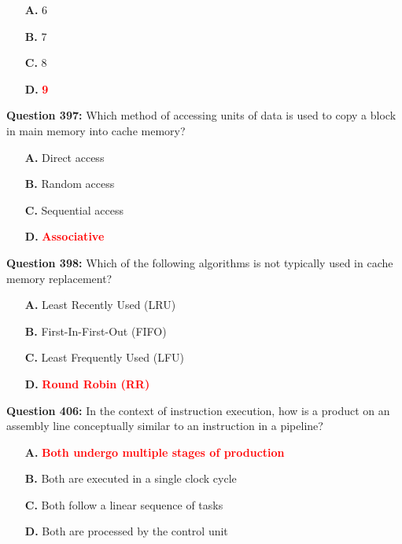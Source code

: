 \documentclass[12pt,a4paper]{article}
\begin{document}
\begin{itemize}
    \item[\textbf{A.}] 6
    \item[\textbf{B.}] 7
    \item[\textbf{C.}] 8
    \item[\textbf{D.}] \textcolor{red}{\textbf{9}}
\end{itemize}

\vspace{0.5cm}

\textbf{Question 397:} Which method of accessing units of data is used to copy a block in main memory into cache memory?

\begin{itemize}
    \item[\textbf{A.}] Direct access
    \item[\textbf{B.}] Random access
    \item[\textbf{C.}] Sequential access
    \item[\textbf{D.}] \textcolor{red}{\textbf{Associative}}
\end{itemize}

\vspace{0.5cm}

\textbf{Question 398:} Which of the following algorithms is not typically used in cache memory replacement?

\begin{itemize}
    \item[\textbf{A.}] Least Recently Used (LRU)
    \item[\textbf{B.}] First-In-First-Out (FIFO)
    \item[\textbf{C.}] Least Frequently Used (LFU)
    \item[\textbf{D.}] \textcolor{red}{\textbf{Round Robin (RR)}}
\end{itemize}

\vspace{0.5cm}

\textbf{Question 406:} In the context of instruction execution, how is a product on an assembly line conceptually similar to an instruction in a pipeline?

\begin{itemize}
    \item[\textbf{A.}] \textcolor{red}{\textbf{Both undergo multiple stages of production}}
    \item[\textbf{B.}] Both are executed in a single clock cycle
    \item[\textbf{C.}] Both follow a linear sequence of tasks
    \item[\textbf{D.}] Both are processed by the control unit
\end{itemize}
\end{document}
